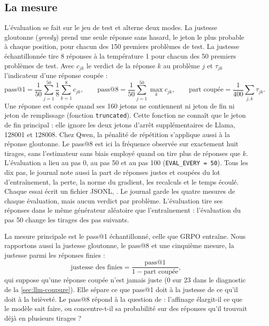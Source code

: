 \subsection{La mesure}

L'évaluation se fait sur le jeu de test et alterne deux modes. La justesse gloutonne (\emph{greedy}) prend une seule
réponse sans hasard, le jeton le plus probable à chaque position, pour chacun des 150 premiers problèmes
de test. La justesse échantillonnée tire
8 réponses à la température 1 pour chacun des 50 premiers problèmes de test. Avec $c_{jk}$ le
verdict de la réponse $k$ au problème $j$ et $\tau_{jk}$ l'indicateur d'une réponse coupée :
\begin{equation}
  \text{pass@1} = \frac{1}{50}\sum_{j=1}^{50} \frac18 \sum_{k=1}^{8} c_{jk}, \qquad
  \text{pass@8} = \frac{1}{50}\sum_{j=1}^{50} \max_{k} c_{jk}, \qquad
  \text{part coupée} = \frac{1}{400}\sum_{j,k} \tau_{jk}.
\end{equation}
Une réponse est coupée quand ses 160 jetons ne contiennent ni jeton de fin ni jeton de remplissage
(fonction \texttt{truncated}). Cette fonction ne connaît que le jeton de fin principal : elle ignore les deux
jetons d'arrêt supplémentaires de Llama, 128001 et 128008. Chez Qwen, la pénalité de
répétition s'applique aussi à la réponse gloutonne. Le pass@8 est ici la fréquence observée sur exactement huit tirages,
sans l'estimateur sans biais employé quand on tire plus de réponses que $k$. L'évaluation a lieu au
pas 0, au pas 50 et au pas 100 (\texttt{EVAL\_EVERY = 50}). Tous les dix pas, le journal note aussi
la part de réponses justes et coupées du lot d'entraînement, la perte, la norme du gradient, les
recalculs et le temps écoulé. Chaque essai écrit un fichier JSONL,
. Le journal garde les quatre mesures
de chaque évaluation, mais aucun verdict par problème. L'évaluation tire ses réponses dans le même générateur
aléatoire que l'entraînement : l'évaluation du pas 50 change les tirages des pas suivants.

La mesure principale est le pass@1 échantillonné, celle que GRPO entraîne. Nous rapportons aussi la
justesse gloutonne, le pass@8 et une cinquième mesure, la justesse parmi les réponses finies :
\begin{equation}
  \text{justesse des finies} = \frac{\text{pass@1}}{1 - \text{part coupée}},
\end{equation}
qui suppose qu'une réponse coupée n'est jamais juste (0 sur 23 dans le diagnostic de la
\cref{sec:llm-coupure}). Elle sépare ce que pass@1 doit à la justesse de ce qu'il doit à la brièveté. Le
pass@8 répond à la question de \textcite{yue2025rlvr} : l'affinage élargit-il ce que le modèle sait faire, ou
concentre-t-il sa probabilité sur des réponses qu'il trouvait déjà en plusieurs tirages ?

